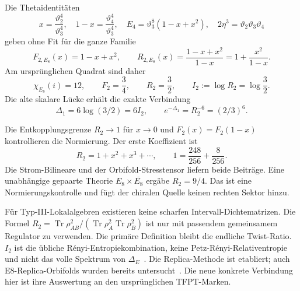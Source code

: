Die Thetaidentitäten
\begin{equation}
x=\frac{\vartheta_2^4}{\vartheta_3^4},\quad
1-x=\frac{\vartheta_4^4}{\vartheta_3^4},\quad
E_4=\vartheta_3^8(1-x+x^2),\quad
2\eta^3=\vartheta_2\vartheta_3\vartheta_4
\end{equation}
geben ohne Fit für die ganze Familie
\begin{equation}\label{eq:replicarational}
\boxed{F_{2,E_8}(x)=1-x+x^2,\qquad
R_{2,E_8}(x)=\frac{1-x+x^2}{1-x}
=1+\frac{x^2}{1-x}.}
\end{equation}
Am ursprünglichen Quadrat sind daher
\begin{equation}
\boxed{\chi_{E_8}(i)=12,\qquad F_2=\frac34,\qquad
R_2=\frac32,\qquad I_2:=\log R_2=\log\frac32.}
\end{equation}
Die alte skalare Lücke erhält die exakte Verbindung
\begin{equation}\label{eq:clockreplicaequality}
\boxed{\Delta_1=6\log(3/2)=6I_2,\qquad
e^{-\Delta_1}=R_2^{-6}=(2/3)^6.}
\end{equation}


Die Entkopplungsgrenze $R_2\to1$ für $x\to0$ und $F_2(x)=F_2(1-x)$ kontrollieren die Normierung. Der erste Koeffizient ist
\begin{equation}
R_2=1+x^2+x^3+\cdots,\qquad
1=\frac{248}{256}+\frac8{256}.
\end{equation}
Die Strom-Bilineare und der Orbifold-Stresstensor liefern beide Beiträge. Eine unabhängige gepaarte Theorie $E_8\times\overline{E_8}$ ergäbe $R_2=9/4$. Das ist eine Normierungskontrolle und fügt der chiralen Quelle keinen rechten Sektor hinzu.

Für Typ-III-Lokalalgebren existieren keine scharfen Intervall-Dichtematrizen. Die Formel
$R_2=\operatorname{Tr}\rho_{AB}^2/
(\operatorname{Tr}\rho_A^2\operatorname{Tr}\rho_B^2)$
ist nur mit passendem gemeinsamem Regulator zu verwenden. Die primäre Definition bleibt die endliche Twist-Ratio.
$I_2$ ist die übliche Rényi-Entropiekombination, keine Petz-Rényi-Relativentropie und nicht das volle Spektrum von $\Delta_E$~\cite{petzrenyi}.
Die Replica-Methode ist etabliert; auch E8-Replica-Orbifolds wurden bereits untersucht~\cite{e8replica}. Die neue konkrete Verbindung hier ist ihre Auswertung an den ursprünglichen TFPT-Marken.

